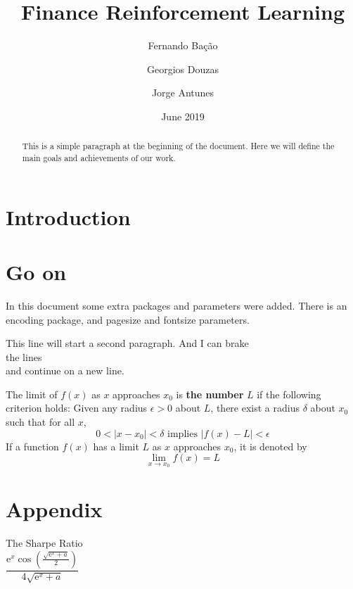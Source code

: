 \documentclass[12pt, a4paper, twoside]{article}
\title{Finance Reinforcement Learning}
\author[*]{Fernando Bação}
\author[*]{Georgios Douzas}
\author[*]{Jorge Antunes}
\affil[*]{Information Management School - NOVA IMS}
\date{June 2019}
\begin{document}
\maketitle

\begin{abstract}
	This is a simple paragraph at the beginning of the document. Here we will define the main goals and achievements of our work.
\end{abstract}


\section{Introduction}


\section{Go on}


In this document some extra packages and parameters
were added. There is an encoding package,
and pagesize and fontsize parameters.

This line will start a second paragraph. And I can
brake\\ the lines \\ and continue on a new line.\par

The limit of $ f(x) $ as $ x $ approaches  $ x_0 $ is \textbf{the number}  $ L $ if the following criterion holds:
Given any radius $ \epsilon > 0 $ about $ L $, there exist a radius $ \delta $ about $ x_0 $ such that for all $ x $,
\[ 0<|x-x_0|<\delta \mbox{ implies } |f(x)-L|<\epsilon \]
If a function $ f(x) $ has a limit $ L $ as $ x $ approaches $ x_0 $,
it is denoted by
\[ \lim\limits_{x\to x_0} f(x)=L \]

\section{Appendix}

The Sharpe Ratio\\

$ \dfrac{\mathrm{e}^x\cos\left(\frac{\sqrt{\mathrm{e}^x+a}}{2}\right)}{4\sqrt{\mathrm{e}^x+a}} $
\end{document}
